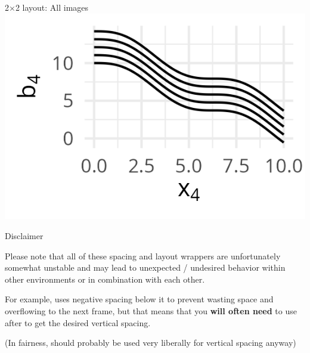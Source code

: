 \documentclass[11pt,compress,t,notes=noshow, xcolor=table]{beamer}
\begin{document}
\begin{frame}{2$\times$2 layout: All images}
{  }{%
    \includegraphics[width=\textwidth]{figure/boosting-cwb-blpool4.png}
  }
\end{frame}

\begin{frame}{Disclaimer}


  \vfill

  Please note that all of these spacing and layout wrappers are unfortunately somewhat unstable and may lead to unexpected / undesired behavior within other environments or in combination with each other.

  \vfill

  For example,  uses negative spacing below it to prevent wasting space and overflowing to the next frame, but that means that you \textbf{will often need} to use  after  to get the desired vertical spacing.

  \vfill

  (In fairness,  should probably be used very liberally for vertical spacing anyway)

\end{frame}

\end{document}
